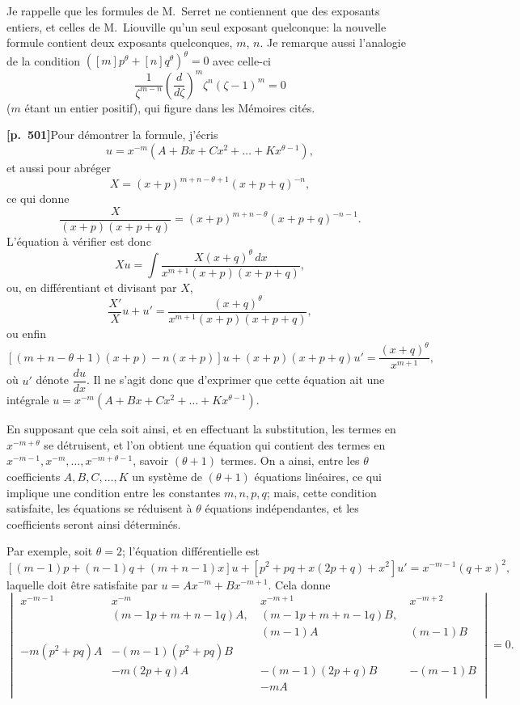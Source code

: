 \documentclass[11pt,a4paper]{article}
\begin{document}
Je rappelle que les formules de M.~Serret ne contiennent que des exposants entiers, et celles de M.~Liouville qu'un seul exposant quelconque: la nouvelle formule contient deux exposants quelconques, $m$, $n$. Je remarque aussi l'analogie de la condition $([m]p^{\theta} + [n]q^{\theta})^{\theta} = 0$ avec celle-ci
\[
\frac{1}{\zeta^{m - n}}\left(\frac{d}{d\zeta}\right)^{m} \zeta^{n} (\zeta - 1)^{m} = 0
\]
($m$ \'etant un entier positif), qui figure dans les M\'emoires cit\'es.

\noindent\textbf{[p.~501]}\quad Pour d\'emontrer la formule, j'\'ecris
\[
u = x^{-m}(A + Bx + Cx^{2} + \ldots + Kx^{\theta - 1}),
\]
et aussi pour abr\'eger
\[
X = (x + p)^{m + n - \theta + 1}(x + p + q)^{-n},
\]
ce qui donne
\[
\frac{X}{(x + p)(x + p + q)} = (x + p)^{m + n - \theta}(x + p + q)^{-n - 1}.
\]
L'\'equation \`a v\'erifier est donc
\[
Xu = \int \frac{X(x + q)^{\theta}\,dx}{x^{m + 1}(x + p)(x + p + q)},
\]
ou, en diff\'erentiant et divisant par $X$,
\[
\frac{X'}{X} u + u' = \frac{(x + q)^{\theta}}{x^{m + 1}(x + p)(x + p + q)},
\]
ou enfin
\[
[(m + n - \theta + 1)(x + p) - n(x + p)] u + (x + p)(x + p + q) u' = \frac{(x + q)^{\theta}}{x^{m + 1}},
\]
o\`u $u'$ d\'enote $\dfrac{du}{dx}$. Il ne s'agit donc que d'exprimer que cette \'equation ait une int\'egrale $u = x^{-m}(A + Bx + Cx^{2} + \ldots + Kx^{\theta - 1})$.

En supposant que cela soit ainsi, et en effectuant la substitution, les termes en $x^{-m + \theta}$ se d\'etruisent, et l'on obtient une \'equation qui contient des termes en $x^{-m - 1}, x^{-m}, \ldots, x^{-m + \theta - 1}$, savoir $(\theta + 1)$ termes. On a ainsi, entre les $\theta$ coefficients $A, B, C, \ldots, K$ un syst\`eme de $(\theta + 1)$ \'equations lin\'eaires, ce qui implique une condition entre les constantes $m, n, p, q$; mais, cette condition satisfaite, les \'equations se r\'eduisent \`a $\theta$ \'equations ind\'ependantes, et les coefficients seront ainsi d\'etermin\'es.

Par exemple, soit $\theta = 2$; l'\'equation diff\'erentielle est
\[
[(m - 1)p + (n - 1)q + (m + n - 1)x] u + [p^{2} + pq + x(2p + q) + x^{2}] u' = x^{-m - 1}(q + x)^{2},
\]
laquelle doit \^etre satisfaite par $u = Ax^{-m} + Bx^{-m + 1}$. Cela donne
\[
\begin{vmatrix}
x^{-m - 1} & x^{-m} & x^{-m + 1} & x^{-m + 2} \\
 & (m - 1p + m + n - 1q)A,\ & (m - 1p + m + n - 1q)B,\ & \\
 &  & (m - 1)A & (m - 1)B \\
-m(p^{2} + pq)A & -(m - 1)(p^{2} + pq)B & & \\
 & -m(2p + q)A & -(m - 1)(2p + q)B & -(m - 1)B \\
 &  & -mA &  \\
\end{vmatrix} = 0.
\]
\end{document}
